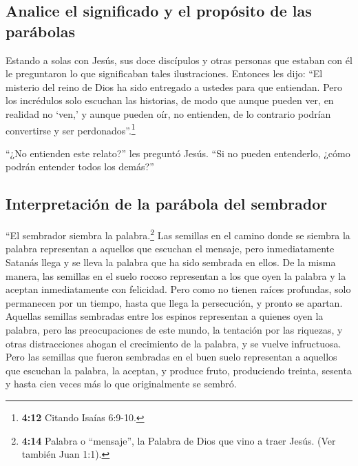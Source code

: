 \hypertarget{analice-el-significado-y-el-propuxf3sito-de-las-paruxe1bolas}{%
\subsection{Analice el significado y el propósito de las
parábolas}\label{analice-el-significado-y-el-propuxf3sito-de-las-paruxe1bolas}}

 Estando a solas con Jesús, sus doce discípulos y otras
personas que estaban con él le preguntaron lo que significaban tales
ilustraciones.  Entonces les dijo: ``El misterio del
reino de Dios ha sido entregado a ustedes para que entiendan. Pero los
incrédulos solo escuchan las historias,  de modo que
aunque pueden ver, en realidad no `ven,' y aunque pueden oír, no
entienden, de lo contrario podrían convertirse y ser
perdonados''.\footnote{\textbf{4:12} Citando Isaías 6:9-10.}

 ``¿No entienden este relato?'' les preguntó Jesús. ``Si
no pueden entenderlo, ¿cómo podrán entender todos los demás?''

\hypertarget{interpretaciuxf3n-de-la-paruxe1bola-del-sembrador}{%
\subsection{Interpretación de la parábola del
sembrador}\label{interpretaciuxf3n-de-la-paruxe1bola-del-sembrador}}

 ``El sembrador siembra la palabra.\footnote{\textbf{4:14}
  Palabra o ``mensaje'', la Palabra de Dios que vino a traer Jesús. (Ver
  también Juan 1:1).}  Las semillas en el camino donde se
siembra la palabra representan a aquellos que escuchan el mensaje, pero
inmediatamente Satanás llega y se lleva la palabra que ha sido sembrada
en ellos.  De la misma manera, las semillas en el suelo
rocoso representan a los que oyen la palabra y la aceptan inmediatamente
con felicidad.  Pero como no tienen raíces profundas,
solo permanecen por un tiempo, hasta que llega la persecución, y pronto
se apartan.  Aquellas semillas sembradas entre los
espinos representan a quienes oyen la palabra,  pero las
preocupaciones de este mundo, la tentación por las riquezas, y otras
distracciones ahogan el crecimiento de la palabra, y se vuelve
infructuosa.  Pero las semillas que fueron sembradas en
el buen suelo representan a aquellos que escuchan la palabra, la
aceptan, y produce fruto, produciendo treinta, sesenta y hasta cien
veces más lo que originalmente se sembró.


